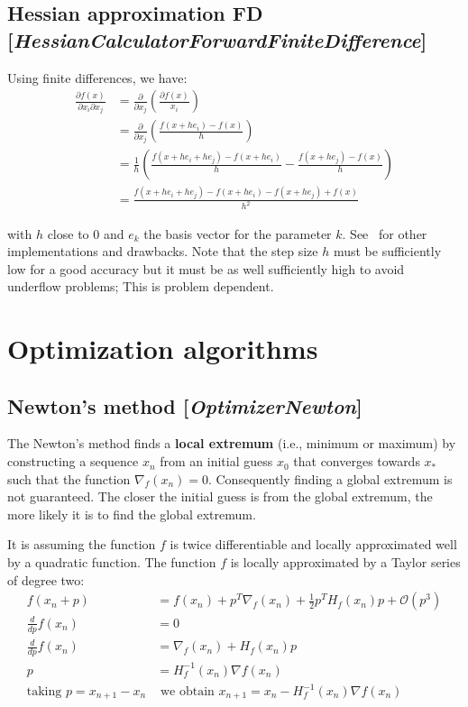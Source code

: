 \documentclass[11pt]{article}
\newcommand{\bigO}{\mathcal{O}}
\newcommand{\nllref}[1]{[\small{\textit{#1}}]}
\begin{document}
\subsection{Hessian approximation FD \nllref{HessianCalculatorForwardFiniteDifference}}
Using finite differences, we have:
\begin{align}
\frac{\partial f(x)}{\partial x_i \partial x_j} &= \frac{\partial}{\partial x_j}( \frac{\partial f(x)}{x_i}) \nonumber\\
&= \frac{\partial}{\partial x_j}( \frac{f(x + he_i) - f(x)}{h} ) \nonumber\\
&= \frac{1}{h}( \frac{f(x + he_i + he_j) - f(x + he_i)}{h} - \frac{f(x + he_j) - f(x)}{h} ) \nonumber\\
&= \frac{f(x + he_i + he_j) - f(x + he_i)-f(x + he_j)+f(x)}{h^2}
\end{align}

with $h$ close to 0 and $e_k$ the basis vector for the parameter $k$. See~\cite{Scolnik01} for other implementations and drawbacks. Note that the step size $h$ must be sufficiently low for a good accuracy but it must be as well sufficiently high to avoid underflow problems; This is problem dependent.

\section{Optimization algorithms}
\subsection{Newton's method \nllref{OptimizerNewton}}
The Newton's method finds a \textbf{local extremum} (i.e., minimum or maximum) by constructing a sequence $x_n$ from an initial guess $x_0$ that converges towards $x_*$ such that the function $\nabla_f(x_n)=0$. Consequently finding a global extremum is not guaranteed. The closer the initial guess is from the global extremum, the more likely it is to find the global extremum.

It is assuming the function $f$ is twice differentiable and locally approximated well by a quadratic function. The function $f$ is locally approximated by a Taylor series of degree two:
\begin{align}
f(x_n + p)&= f(x_n) + p^T \nabla_f(x_n) + \frac{1}{2} p^T H_f(x_n) p + \bigO(p^3) \nonumber\\
\frac{d}{dp}f(x_n) &= 0 \nonumber\\
\frac{d}{dp}f(x_n) &=\nabla_f(x_n) + H_f(x_n) p \nonumber\\
p &= H_f^{-1}(x_n) \nabla{f}(x_n) \nonumber\\
\text{taking~} p = x_{n+1} - x_n \nonumber
&\text{~we obtain~} x_{n+1} = x_n - H_f^{-1}(x_n) \nabla{f}(x_n)
\end{align}
\end{document}

